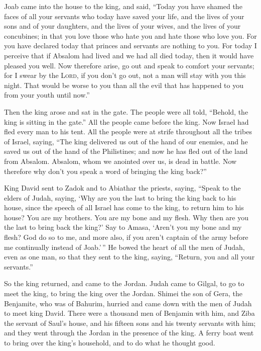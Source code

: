  Joab came into the house to the king, and said, ``Today
you have shamed the faces of all your servants who today have saved your
life, and the lives of your sons and of your daughters, and the lives of
your wives, and the lives of your concubines;  in that you
love those who hate you and hate those who love you. For you have
declared today that princes and servants are nothing to you. For today I
perceive that if Absalom had lived and we had all died today, then it
would have pleased you well.  Now therefore arise, go out
and speak to comfort your servants; for I swear by the \textsc{Lord}, if
you don't go out, not a man will stay with you this night. That would be
worse to you than all the evil that has happened to you from your youth
until now.''

 Then the king arose and sat in the gate. The people were
all told, ``Behold, the king is sitting in the gate.'' All the people
came before the king. Now Israel had fled every man to his tent.
 All the people were at strife throughout all the tribes
of Israel, saying, ``The king delivered us out of the hand of our
enemies, and he saved us out of the hand of the Philistines; and now he
has fled out of the land from Absalom.  Absalom, whom we
anointed over us, is dead in battle. Now therefore why don't you speak a
word of bringing the king back?''

 King David sent to Zadok and to Abiathar the priests,
saying, ``Speak to the elders of Judah, saying, `Why are you the last to
bring the king back to his house, since the speech of all Israel has
come to the king, to return him to his house?  You are my
brothers. You are my bone and my flesh. Why then are you the last to
bring back the king?'  Say to Amasa, `Aren't you my bone
and my flesh? God do so to me, and more also, if you aren't captain of
the army before me continually instead of Joab.'\,''  He
bowed the heart of all the men of Judah, even as one man, so that they
sent to the king, saying, ``Return, you and all your servants.''

 So the king returned, and came to the Jordan. Judah came
to Gilgal, to go to meet the king, to bring the king over the Jordan.
 Shimei the son of Gera, the Benjamite, who was of
Bahurim, hurried and came down with the men of Judah to meet king David.
 There were a thousand men of Benjamin with him, and Ziba
the servant of Saul's house, and his fifteen sons and his twenty
servants with him; and they went through the Jordan in the presence of
the king.  A ferry boat went to bring over the king's
household, and to do what he thought good.

